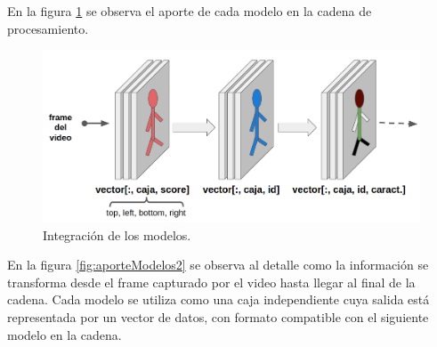 En la figura \ref{fig:aporteModelos} se observa el aporte de cada modelo en la cadena de procesamiento.

\begin{figure}[ht]
	\centering
	\includegraphics[scale=.50]{./Figures/aporteModelos.png}
	\caption{Integración de los modelos.}
	\label{fig:aporteModelos}
\end{figure}

\newpage

En la figura \ref{fig:aporteModelos2} se observa al detalle como la información se transforma desde el frame capturado por el video hasta llegar al final de la cadena. Cada modelo se utiliza como una caja independiente cuya salida está representada por un vector de datos, con formato compatible con el siguiente modelo en la cadena.

